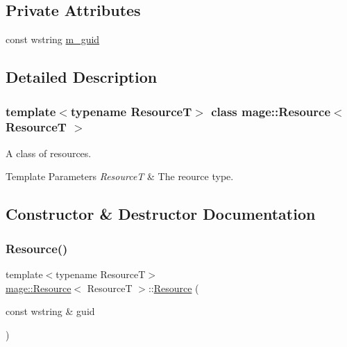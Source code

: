 \subsection*{Private Attributes}
\begin{DoxyCompactItemize}
\item 
const wstring \hyperlink{classmage_1_1_resource_ad2924d9bc9ddecf06475b52a8c7065d8}{m\+\_\+guid}
\end{DoxyCompactItemize}


\subsection{Detailed Description}
\subsubsection*{template$<$typename ResourceT$>$\newline
class mage\+::\+Resource$<$ Resource\+T $>$}

A class of resources.


\begin{DoxyTemplParams}{Template Parameters}
{\em ResourceT} & The reource type. \\
\hline
\end{DoxyTemplParams}


\subsection{Constructor \& Destructor Documentation}
\hypertarget{classmage_1_1_resource_a4a3302689084a35e8c857953709691be}{}\label{classmage_1_1_resource_a4a3302689084a35e8c857953709691be} 
\subsubsection{\texorpdfstring{Resource()}{Resource()}\hspace{0.1cm}{\footnotesize\ttfamily [1/3]}}
{\footnotesize\ttfamily template$<$typename ResourceT$>$ \\
\hyperlink{classmage_1_1_resource}{mage\+::\+Resource}$<$ ResourceT $>$\+::\hyperlink{classmage_1_1_resource}{Resource} (\begin{DoxyParamCaption}\item[{const wstring \&}]{guid }\end{DoxyParamCaption})\hspace{0.3cm}{\ttfamily [explicit]}}

